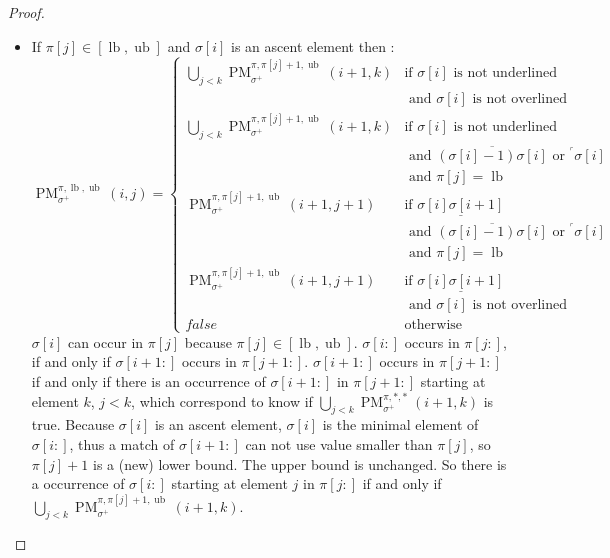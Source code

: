 \documentclass[a4paper]{llncs}
\newcommand{\ptext}{\pi}
\newcommand{\pmotif}{\sigma}
\newcommand{\pbmotif}{\pmotif^+}
\DeclareMathOperator{\PMa}{PM}
\newcommand{\PM}[6]{\PMa_{{#1}}^{{#2},{#3},{#4}}({#5},{#6})}
\DeclareMathOperator{\lb}{lb}
\DeclareMathOperator{\ub}{ub}
\begin{document}
\begin{proof}
\begin{itemize}
	\item If $\ptext[j] \in [\lb,\ub]$ and $\pmotif[i]$ is an ascent element then :
	$$
	\PM{\pbmotif}{\ptext}{\lb}{\ub}{i}{j}= 
	\begin{cases}
		\bigcup_{j<k} \PM{\pbmotif}{\ptext}{\ptext[j]+1}{\ub}{i+1}{k}
			& \text{if $\pmotif[i]$ is not underlined } \\
			& \text{ and $\pmotif[i]$ is not overlined} \\ 
		\bigcup_{j<k} \PM{\pbmotif}{\ptext}{\ptext[j]+1}{\ub}{i+1}{k}
			& \text{if $\pmotif[i]$ is not underlined } \\
			& \text{ and $\overline{(\pmotif[i]-1)\pmotif[i]}$ or $^\ulcorner{\pmotif[i]}$}\\ 	
			& \text{ and $\ptext[j]=\lb$} \\
		\PM{\pbmotif}{\ptext}{\ptext[j]+1}{\ub}{i+1}{j+1}	
			& \text{if $\underline{\pmotif[i]\pmotif[i+1]}$ } \\
			& \text{ and $\overline{(\pmotif[i]-1)\pmotif[i]}$ or $^\ulcorner{\pmotif[i]}$}\\ 	
			& \text{ and $\ptext[j]=\lb$} \\				
		\PM{\pbmotif}{\ptext}{\ptext[j]+1}{\ub}{i+1}{j+1}	
			& \text{if $\underline{\pmotif[i]\pmotif[i+1]}$ } \\
			& \text{ and $\pmotif[i]$ is not overlined} \\
		false & \text{otherwise}
		 	
	\end{cases}
	$$	
	$\pmotif[i]$ can occur in $\ptext[j]$ because $\ptext[j] \in [\lb,\ub]$. $\pmotif[i:]$ occurs in $\ptext[j:]$, if and only if $\pmotif[i+1:]$ occurs in $\ptext[j+1:]$. $\pmotif[i+1:]$ occurs in $\ptext[j+1:]$ if and only if there is an occurrence of $\pmotif[i+1:]$ in $\ptext[j+1:]$ starting at element $k$, $j<k$, which correspond to know if $\bigcup_{j<k} \PM{\pbmotif}{\ptext}{*}{*}{i+1}{k}$ is true. Because $\pmotif[i]$ is an ascent element,  $\pmotif[i]$ is the minimal element of $\pmotif[i:]$, thus a match of $\pmotif[i+1:]$ can not use value smaller than $\ptext[j]$, so $\ptext[j]+1$ is a (new) lower bound. The upper bound is unchanged. So there is a occurrence of  $\pmotif[i:]$ starting at element $j$ in $\ptext[j:]$ if and only if $\bigcup_{j<k} \PM{\pbmotif}{\ptext}{\ptext[j]+1}{\ub}{i+1}{k}$. 
	

\end{itemize}
\end{proof}
\end{document}
